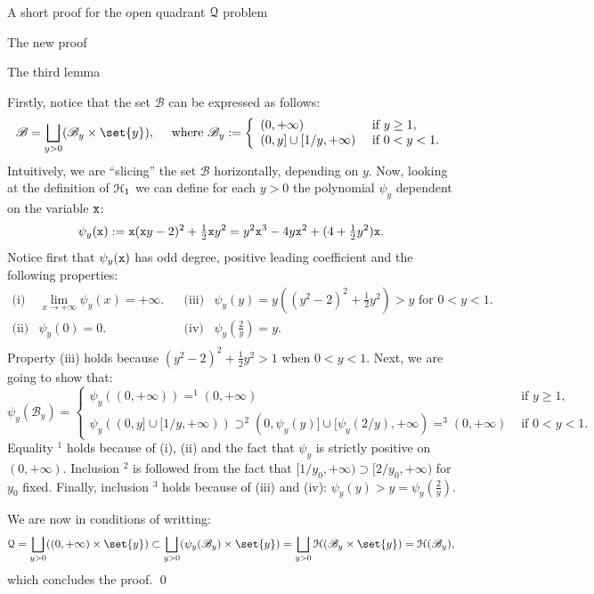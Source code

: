 \documentclass[11pt, a4paper, english, twoside, notitlepage, openright]{report}
\begin{document}
\begin{chapter}{A short proof for the open quadrant $\mathcal{Q}$ problem}
\begin{section}{The new proof}
\begin{subsection}{The third lemma}
\begin{lemma}
\begin{Proof}
Firstly, notice that the set $\mathscr{B}$ can be expressed as follows:
$$
\mathscr{B} = \bigsqcup_{y>0}(\mathscr{B}_y \times \set{y}), \quad \text{ where } \mathscr{B}_y := 
\left\{
\begin{array}{ll}
(0, +\infty) & \text{ if } y \ge 1,\\
(0, y] \cup [1/y, +\infty) & \text { if } 0 < y < 1.
\end{array}
\right.
$$
Intuitively, we are ``slicing'' the set $\mathscr{B}$ horizontally, depending on $y$. Now, looking at the definition of $\mathcal{H}_1$ we can define for each $y > 0$ the polynomial $\psi_y$ dependent on the variable ${\tt x}$:
$$
\psi_y({\tt x}) := {\tt x}({\tt x}y - 2)^2 + \tfrac{1}{2}{\tt x}y^2 = y^2{\tt x}^3 - 4y{\tt x}^2 + (4 + \tfrac{1}{2}y^2){\tt x}.
$$
Notice first that $\psi_y({\tt x})$ has odd degree, positive leading coefficient and the following properties:
$$
\begin{array}{llcll}
\text{(i)}& \lim_{x\rightarrow+\infty}\psi_y(x) = +\infty. & &
\text{(iii)}& \psi_y(y) = y((y^2 - 2)^2 + \tfrac{1}{2}y^2) > y \text{ for } 0 < y < 1.\\
\text{(ii)}& \psi_y(0) = 0. & &
\text{(iv)}& \psi_y\left(\tfrac{2}{y}\right) = y.\\
\end{array}
$$
Property (iii) holds because $(y^2 - 2)^2 + \tfrac{1}{2}y^2 > 1$ when $0 < y < 1$. Next, we are going to show that:
$$
\psi_y(\mathscr{B}_y) = 
\left\{
\begin{array}{ll}
\psi_y((0, +\infty)) =^1 (0, +\infty) & \text{ if } y \ge 1,\\
\psi_y((0, y] \cup [1/y, +\infty)) \supset^2 (0, \psi_y(y)] \cup [\psi_y(2/y), +\infty) =^3 (0, +\infty) & \text { if } 0 < y < 1.
\end{array}
\right.
$$
Equality $^1$ holds because of (i), (ii) and the fact that $\psi_y$ is strictly positive on $(0, +\infty)$. Inclusion $^2$ is followed from the fact that $[1/y_0, +\infty) \supset [2/y_0, +\infty)$ for $y_0$ fixed. Finally, inclusion $^3$ holds because of (iii) and (iv): $\psi_y(y) > y = \psi_y\left(\tfrac{2}{y}\right)$.

We are now in conditions of writting:
$$
\Qu = \bigsqcup_{y>0}((0, +\infty) \times \set{y}) \subset \bigsqcup_{y>0}(\psi_y(\mathscr{B}_y) \times \set{y}) = \bigsqcup_{y>0}\HH(\mathscr{B}_y \times \set{y}) = \HH(\mathscr{B}_y),
$$
which concludes the proof.
\qed
\end{Proof}
\end{lemma}
\end{subsection}


\end{section}
\end{chapter}
\end{document}

